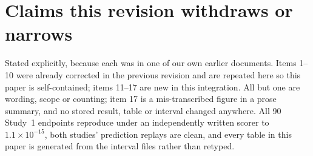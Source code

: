 \documentclass[10pt]{article}
\begin{document}
\section{Claims this revision withdraws or narrows}
\label{sec:withdrawn}

Stated explicitly, because each was in one of our own earlier documents. Items 1--10 were already
corrected in the previous revision and are repeated here so this paper is self-contained; items
11--17 are new in this integration. All but one are wording, scope or counting; item 17 is a
mis-transcribed figure in a prose summary, and no stored result, table or interval changed
anywhere. All 90 Study~1 endpoints reproduce under an independently written scorer to
$1.1\times10^{-15}$, both studies' prediction replays are clean, and every table in this paper is
generated from the interval files rather than retyped.
\end{document}
